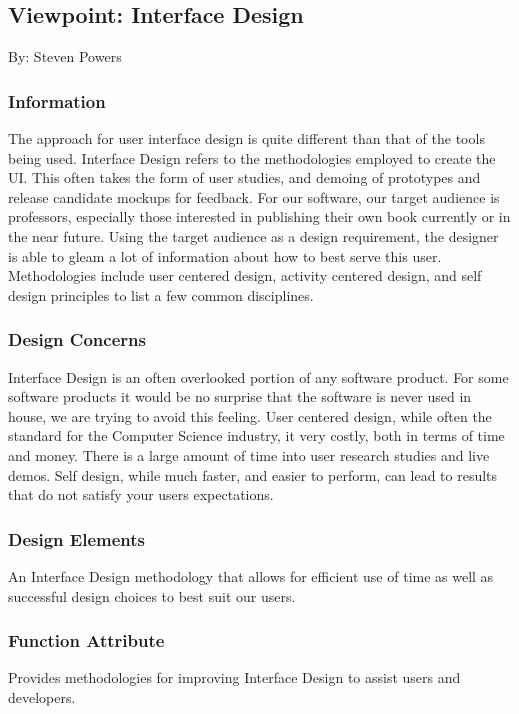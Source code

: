 \documentclass[letterpaper, 10pt, draftclsnofoot, compsoc, onecolumn]{IEEEtran}
\begin{document}
\subsection{Viewpoint: Interface Design}
{\noindent By: Steven Powers \par}

\subsubsection{Information}
{\noindent The approach for user interface design is quite different 
than that of the tools being used. Interface Design refers to the 
methodologies employed to create the UI. This often takes the form of 
user studies, and demoing of prototypes and release candidate mockups 
for feedback. For our software, our target audience is professors, 
especially those interested in publishing their own book currently or 
in the near future. Using the target audience as a design requirement, 
the designer is able to gleam a lot of information about how to best 
serve this user. 
Methodologies include user centered design, activity centered design, 
and self design principles to list a few common disciplines.   \par}

\subsubsection{Design Concerns}
{\noindent Interface Design is an often overlooked portion of any software product. 
For some software products it would be no surprise that the software is never 
used in house, we are trying to avoid this feeling. 
User centered design, while often the standard for the Computer Science industry, it
very costly, both in terms of time and money. There is a large amount of time into 
user research studies and live demos. Self design, while much faster, 
and easier to perform, can lead to results that do not satisfy your users expectations.\par}

\subsubsection{Design Elements}
{\noindent An Interface Design methodology that allows for efficient 
use of time as well as successful design choices to best suit our users. \par}

\subsubsection{Function Attribute}
{\noindent Provides methodologies for improving Interface Design to assist 
users and developers. \par}
\end{document}

